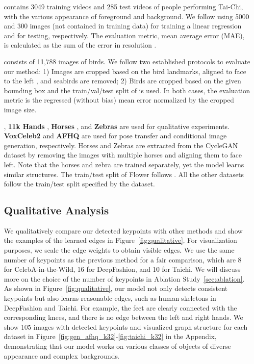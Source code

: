 \documentclass{article}
\begin{document}
\noindent{} \cite{Siarohin_2019_NeurIPS} contains 3049 training videos and 285 test
videos of people performing Tai-Chi, with the various appearance of foreground and background. We follow \cite{siarohin2021motion} using 5000 and 300 images (not contained in training data) for training a linear regression and for testing, respectively. The evaluation metric, mean average error (MAE), is calculated as the sum of the  error in resolution .

\noindent{} \cite{WahCUB_200_2011} consists of 11,788 images of birds. We follow two established protocols \cite{lorenz2019unsupervised, choudhury2021unsupervised} to evaluate our method: 1) Images are cropped based on the bird landmarks, aligned to face to the left \cite{lorenz2019unsupervised}, and seabirds are removed; 2) Birds are cropped based on the given bounding box and the train/val/test split of \cite{choudhury2021unsupervised} is used. In both cases, the evaluation metric is the regressed (without bias) mean  error normalized by the cropped image size.

\noindent{} \cite{Nilsback08}, \textbf{11k Hands} \cite{afifi201911kHands}, \textbf{Horses} \cite{zhu2017unpaired}, and \textbf{Zebras} \cite{zhu2017unpaired} are used for qualitative experiments. \textbf{VoxCeleb2} \cite{chung18voxceleb2} and \textbf{AFHQ} \cite{choi2020stargan} are used for pose transfer and conditional image generation, respectively. 
Horses and Zebras are extracted from the CycleGAN dataset \cite{zhu2017unpaired} by removing the images with multiple horses and aligning them to face left. Note that the horses and zebra are trained separately, yet the model learns similar structures. The train/test split of Flower follows \cite{chen2019unsupervised}. All the other datasets follow the train/test split specified by the dataset.

\subsection{Qualitative Analysis}

We qualitatively compare our detected keypoints with other methods and show the examples of the learned edges in Figure~\ref{fig:qualitative}. For visualization purposes, we scale the edge weights 
to obtain visible edges.
We use the same number of keypoints as the previous method \cite{he2022ganseg} for a fair comparison, which are 8 for CelebA-in-the-Wild, 16 for DeepFashion, and 10 for Taichi. We will discuss more on the choice of the number of keypoints in Ablation Study~\ref{sec:ablation}. As shown in Figure~\ref{fig:qualitative}, our model not only detects consistent keypoints but also learns reasonable edges, such as human skeletons in DeepFashion and Taichi. For example, the feet are clearly connected with the corresponding knees, and there is no edge between the left and right hands. We show 105 images with detected keypoints and visualized graph structure for each dataset in Figure~\ref{fig:gen_afhq_k32}-\ref{fig:taichi_k32} in the Appendix, demonstrating that our model works on various classes of objects of diverse appearance and complex backgrounds.
\end{document}
